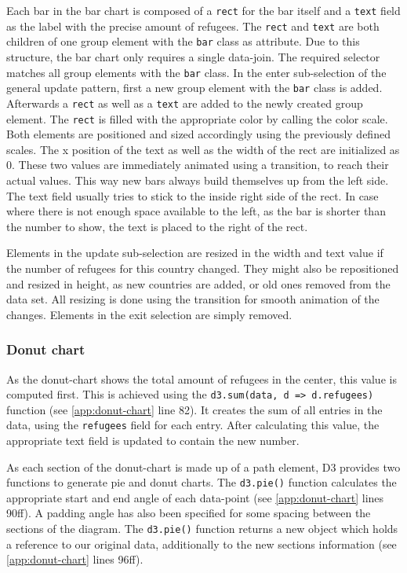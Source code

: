 Each bar in the bar chart is composed of a \texttt{rect} for the bar itself and a \texttt{text} field as the label with the precise amount of refugees. The \texttt{rect} and \texttt{text} are both children of one group element with the \texttt{bar} class as attribute. Due to this structure, the bar chart only requires a single data-join. The required selector matches all group elements with the \texttt{bar} class. In the enter sub-selection of the general update pattern, first a new group element with the \texttt{bar} class is added. Afterwards a \texttt{rect} as well as a \texttt{text} are added to the newly created group element. The \texttt{rect} is filled with the appropriate color by calling the color scale. Both elements are positioned and sized accordingly using the previously defined scales. The x position of the text as well as the width of the rect are initialized as 0. These two values are immediately animated using a transition, to reach their actual values. This way new bars always build themselves up from the left side. The text field usually tries to stick to the inside right side of the rect. In case where there is not enough space available to the left, as the bar is shorter than the number to show, the text is placed to the right of the rect.

Elements in the update sub-selection are resized in the width and text value if the number of refugees for this country changed. They might also be repositioned and resized in height, as new countries are added, or old ones removed from the data set. All resizing is done using the transition for smooth animation of the changes. Elements in the exit selection are simply removed.

\subsubsection{Donut chart}

As the donut-chart shows the total amount of refugees in the center, this value is computed first. This is achieved using the \texttt{d3.sum(data, d => d.refugees)} function (see \ref{app:donut-chart} line 82). It creates the sum of all entries in the data, using the \texttt{refugees} field for each entry. After calculating this value, the appropriate text field is updated to contain the new number.

As each section of the donut-chart is made up of a path element, D3 provides two functions to generate pie and donut charts. The \texttt{d3.pie()} function calculates the appropriate start and end angle of each data-point (see \ref{app:donut-chart} lines 90ff). A padding angle has also been specified for some spacing between the sections of the diagram. The \texttt{d3.pie()} function returns a new object which holds a reference to our original data, additionally to the new sections information (see \ref{app:donut-chart} lines 96ff). 

